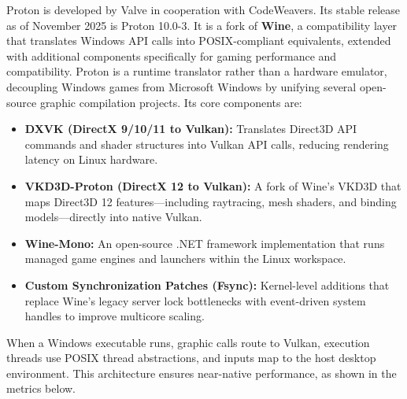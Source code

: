 \documentclass{article}
\begin{document}
\noindent Proton is developed by Valve in cooperation with CodeWeavers. Its stable
release as of November 2025 is Proton 10.0-3.  It is a fork of
\textbf{Wine}, a compatibility layer that translates Windows API calls into
POSIX-compliant equivalents, extended with additional components specifically
for gaming performance and compatibility. Proton is a runtime translator rather than a hardware emulator, decoupling Windows games from Microsoft Windows by unifying several open-source graphic compilation projects. Its core components are:

\begin{itemize}[leftmargin=1.5em, nosep, label={\tiny\textbullet}]
	\item \textbf{DXVK (DirectX 9/10/11 to Vulkan):} Translates Direct3D API commands and shader structures into Vulkan API calls, reducing rendering latency on Linux hardware.
	\item \textbf{VKD3D-Proton (DirectX 12 to Vulkan):} A fork of Wine's VKD3D that maps Direct3D 12 features—including raytracing, mesh shaders, and binding models—directly into native Vulkan.
	\item \textbf{Wine-Mono:} An open-source .NET framework implementation that runs managed game engines and launchers within the Linux workspace.
	\item \textbf{Custom Synchronization Patches (Fsync):} Kernel-level additions that replace Wine's legacy server lock bottlenecks with event-driven system handles to improve multicore scaling.
\end{itemize}

When a Windows executable runs, graphic calls route to Vulkan, execution threads use POSIX thread abstractions, and inputs map to the host desktop environment. This architecture ensures near-native performance, as shown in the metrics below.
\end{document}
